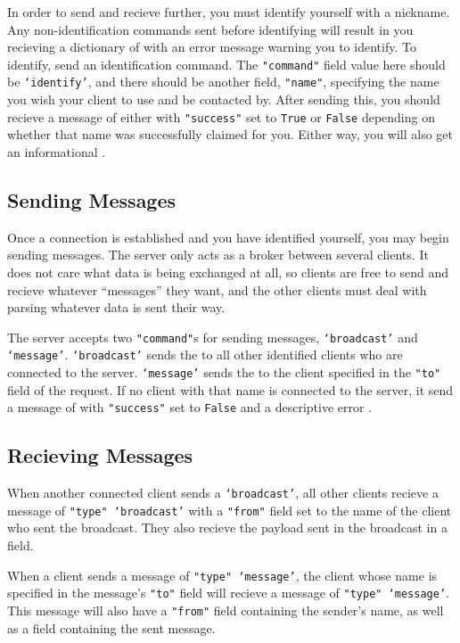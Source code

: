 \documentclass[12pt,letterpaper]{article}
\begin{document}
In order to send and recieve further, you must identify yourself with a nickname. Any non-identification commands sent before identifying will result in you recieving a dictionary of \outcome  with an error message warning you to identify. To identify, send an identification command. The \texttt{"command"} field value here should be \texttt{`identify'}, and there should be another field, \texttt{"name"}, specifying the name you wish your client to use and be contacted by. After sending this, you should recieve a message of \outcome either with \texttt{"success"} set to \texttt{True} or \texttt{False} depending on whether that name was successfully claimed for you. Either way, you will also get an informational \ttmessage.


\subsection{Sending Messages}
Once a connection is established and you have identified yourself, you may begin sending messages. The server only acts as a broker between several clients. It does not care what data is being exchanged at all, so clients are free to send and recieve whatever ``messages'' they want, and the other clients must deal with parsing whatever data is sent their way.

The server accepts two \texttt{"command"}s for sending messages, \texttt{`broadcast'} and \texttt{`message'}. \texttt{`broadcast'} sends the \ttmessage to all other identified clients who are connected to the server. \texttt{`message'} sends the \ttmessage to the client specified in the \texttt{"to"} field of the request. If no client with that name is connected to the server, it send a message of \outcome  with \texttt{"success"}  set to \texttt{False}  and a descriptive error \ttmessage.

\subsection{Recieving Messages}
When another connected client sends a \texttt{`broadcast'}, all other clients recieve a message of \texttt{"type" `broadcast'} with a \texttt{"from"} field set to the name of the client who sent the broadcast. They also recieve the \ttmessage  payload sent in the broadcast in a \ttmessage field.

When a client sends a message of \texttt{"type" `message'}, the client whose name is specified in the message's \texttt{"to"} field will recieve a message of \texttt{"type" `message'}. This message will also have a \texttt{"from"} field containing the sender's name, as well as a \ttmessage  field containing the sent message.
\end{document}
